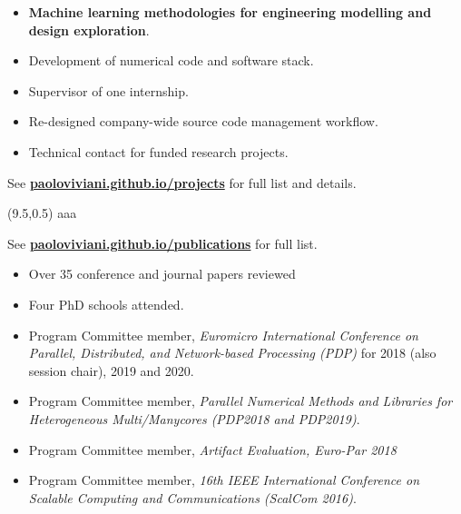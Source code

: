 \documentclass[10pt,a4paper]{altacv}
\begin{document}
\divider

\begin{itemize}
\item \textbf{Machine learning methodologies for engineering modelling and design exploration}.
\item Development of numerical code and software stack.
\item Supervisor of one internship.
\item Re-designed company-wide source code management workflow.
\item Technical contact for funded research projects.
\end{itemize}

\divider

See \href{http://paoloviviani.github.io/projects}{\color{accent}\textbf{paoloviviani.github.io/projects}} for full list and details.
\medskip


\clearpage

\vspace{0.5cm}
\begin{textblock}{10}(9.5,0.5)
  \centering
	aaa
  \vspace{278mm}
\end{textblock}

\renewcommand*{\bibfont}{\small}
See \href{https://paoloviviani.github.io/publications}{\color{accent}\textbf{paoloviviani.github.io/publications}} for full list.
\medskip
\medskip
\nocite{*}
\medskip
\printbibliography[heading=none]

\divider

\begin{itemize}
\item Over 35 conference and journal papers reviewed
\item Four PhD schools attended.
\item Program Committee member, \textit{Euromicro International Conference on Parallel, Distributed, and Network-based Processing (PDP)} for 2018 (also session chair), 2019 and 2020.
\item Program Committee member, \textit{Parallel Numerical Methods and Libraries for Heterogeneous Multi/Manycores (PDP2018 and PDP2019)}.
\item Program Committee member, \textit{Artifact Evaluation, Euro-Par 2018}
\item Program Committee member, \textit{16th IEEE International Conference on Scalable Computing and Communications (ScalCom 2016)}.
\end{itemize}
\end{document}
